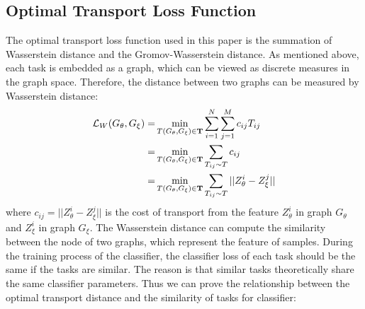 \documentclass[10pt,journal,compsoc]{IEEEtran}
\begin{document}
\subsection{Optimal Transport Loss Function}

The optimal transport loss function used in this paper is the summation of Wasserstein distance and the Gromov-Wasserstein distance. As mentioned above, each task is embedded as a graph, which can be viewed as discrete measures in the graph space. Therefore, the distance between two graphs can be measured by Wasserstein distance:
\begin{align}
    \mathcal{L}_{W}(G_\theta,G_\xi) = &\min_{T(G_\theta,G_\xi)\in\mathbf{T}}\sum_{i=1}^N\sum_{j=1}^M c_{ij}T_{ij}\notag\\
    = &\min_{T(G_\theta,G_\xi)\in\mathbf{T}} \sum_{T_{ij}\sim T}c_{ij}\notag\\
    = &\min_{T(G_\theta,G_\xi)\in\mathbf{T}} \sum_{T_{ij}\sim T} ||Z_\theta^i - Z_\xi^j||
\end{align}
where $c_{ij} = ||Z_\theta^i - Z_\xi^j||$ is the cost of transport from the feature $Z_\theta^i$ in graph $G_\theta$ and $Z_\xi^i$ in graph $G_\xi$. The Wasserstein distance can compute the similarity between the node of two graphs, which represent the feature of samples. During the training process of the classifier, the classifier loss of each task should be the same if the tasks are similar. The reason is that similar tasks theoretically share the same classifier parameters. Thus we can prove the relationship between the optimal transport distance and the similarity of tasks for classifier:
\end{document}
